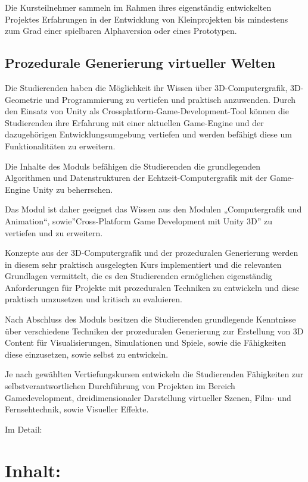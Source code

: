 Die Kursteilnehmer sammeln im Rahmen ihres eigenständig entwickelten
Projektes Erfahrungen in der Entwicklung von Kleinprojekten bis
mindestens zum Grad einer spielbaren Alphaversion oder eines Prototypen.

\subsection*{Prozedurale Generierung virtueller
Welten}\label{prozedurale-generierung-virtueller-welten}

Die Studierenden haben die Möglichkeit ihr Wissen über
3D-Computergrafik, 3D-Geometrie und Programmierung zu vertiefen und
praktisch anzuwenden. Durch den Einsatz von Unity als
Crossplatform-Game-Development-Tool können die Studierenden ihre
Erfahrung mit einer aktuellen Game-Engine und der dazugehörigen
Entwicklungsumgebung vertiefen und werden befähigt diese um
Funktionalitäten zu erweitern.

Die Inhalte des Moduls befähigen die Studierenden die grundlegenden
Algorithmen und Datenstrukturen der Echtzeit-Computergrafik mit der
Game-Engine Unity zu beherrschen.

Das Modul ist daher geeignet das Wissen aus den Modulen „Computergrafik
und Animation``, sowie''Cross-Platform Game Development mit Unity 3D''
zu vertiefen und zu erweitern.

Konzepte aus der 3D-Computergrafik und der prozeduralen Generierung
werden in diesem sehr praktisch ausgelegten Kurs implementiert und die
relevanten Grundlagen vermittelt, die es den Studierenden ermöglichen
eigenständig Anforderungen für Projekte mit prozeduralen Techniken zu
entwickeln und diese praktisch umzusetzen und kritisch zu evaluieren.

Nach Abschluss des Moduls besitzen die Studierenden grundlegende
Kenntnisse über verschiedene Techniken der prozeduralen Generierung zur
Erstellung von 3D Content für Visualisierungen, Simulationen und Spiele,
sowie die Fähigkeiten diese einzusetzen, sowie selbst zu entwickeln.

Je nach gewählten Vertiefungskursen entwickeln die Studierenden
Fähigkeiten zur selbstverantwortlichen Durchführung von Projekten im
Bereich Gamedevelopment, dreidimensionaler Darstellung virtueller
Szenen, Film- und Fernsehtechnik, sowie Visueller Effekte.

Im Detail:

\section*{Inhalt:}\label{inhalt-25}

